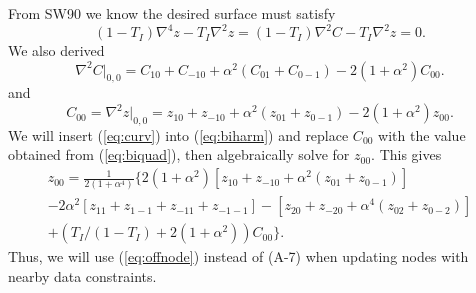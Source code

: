 \documentclass[12pt,letterpaper,margin=0.5in]{article}
\begin{document}
From SW90 we know the desired surface must satisfy
\begin{equation}
\left( 1 - T_I\right)\nabla^4 z - T_I \nabla^2 z = \left( 1 - T_I\right)\nabla^2 C - T_I \nabla^2 z = 0.
\label{eq:biharm}
\end{equation}
We also derived
\begin{equation}
\nabla^2 C \rvert _{0, 0} = C_{10} + C_{-10} + \alpha^2(C_{01} + C_{0-1}) - 2 (1+\alpha^2)C_{00}.
\label{eq:curv}
\end{equation}
and
\begin{equation}
C_{00} = \nabla^2 z \rvert _{0, 0} = z_{10} + z_{-10} + \alpha^2(z_{01} + z_{0-1}) - 2 (1+\alpha^2)z_{00}.
\end{equation}
We will insert (\ref{eq:curv}) into (\ref{eq:biharm}) and replace $C_{00}$ with the value obtained from (\ref{eq:biquad}), then algebraically solve for $z_{00}$.
This gives
\begin{equation}
\begin{split}
z_{00} = \frac{1}{2(1+\alpha^4)} \{ 2(1+\alpha^2) \left [ z_{10}+z_{-10}+\alpha^2(z_{01}+z_{0-1})\right ] \\
	-2\alpha^2\left [z_{11} + z_{1-1} + z_{-11} + z_{-1-1}\right ] - \left [z_{20} + z_{-20} + \alpha^4 (z_{02} + z_{0-2})\right ] \\
	+ \left (T_I/(1-T_I) + 2(1+\alpha^2)\right )C_{00} \}.
\label{eq:offnode}
\end{split}
\end{equation}
Thus, we will use (\ref{eq:offnode}) instead of (A-7) when updating nodes with nearby data constraints.
\end{document}
